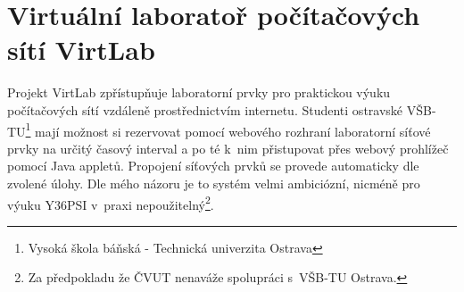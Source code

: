 \section{Virtuální laboratoř počítačových sítí VirtLab}
Projekt VirtLab \cite{reserse:virtlab} zpřístupňuje laboratorní prvky pro praktickou výuku počítačových sítí vzdáleně prostřednictvím internetu. Studenti ostravské VŠB-TU\footnote{Vysoká škola báňská - Technická univerzita Ostrava} mají možnost si rezervovat pomocí webového rozhraní laboratorní síťové prvky na určitý časový interval a po té k~nim přistupovat přes webový prohlížeč pomocí Java appletů. Propojení síťových prvků se provede automaticky dle zvolené úlohy. Dle mého názoru je to systém velmi ambiciózní, nicméně pro výuku Y36PSI v~praxi nepoužitelný\footnote{Za předpokladu že ČVUT nenaváže spolupráci s~VŠB-TU Ostrava.}.




